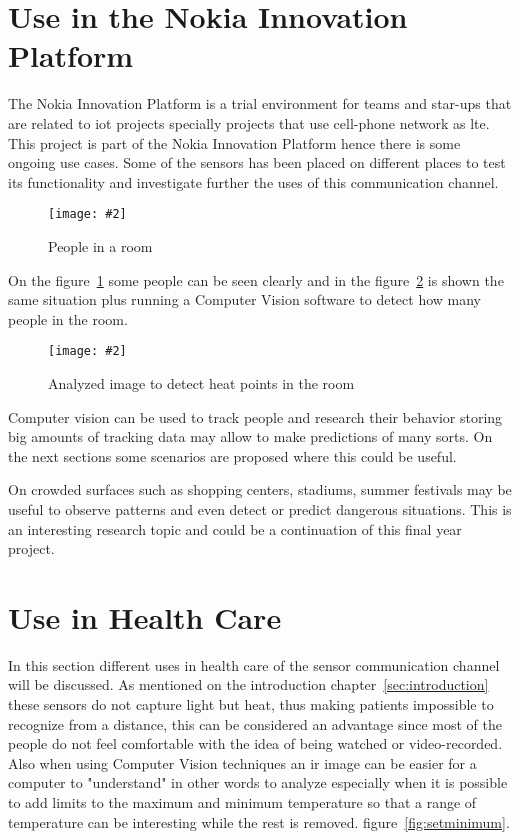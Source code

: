 \documentclass[hidelinks,11pt,a4paper,oneside,article]{memoir}
\newcommand{\putimage}[3][10] %
{
\begin{figure}[h]
	\centering
	\captionsetup{justification=centering}
	\texttt{[image: \#2]}
	\caption{#3}
	\label{fig:#2}
\end{figure}
}
\begin{document}
\section{Use in the Nokia Innovation Platform}\label{sec:use-in-the-nokia-innovation-platform}
The Nokia Innovation Platform is a trial environment for teams and star-ups that are related to \gls{iot} projects specially projects that use cell-phone network as \gls{lte}. This project is part of the Nokia Innovation Platform hence there is some ongoing use cases. Some of the sensors has been placed on different places to test its functionality and investigate further the uses of this communication channel.

	\putimage{people}{People in a room}
	
On the figure~\ref{fig:people} some people can be seen clearly and in the figure~\ref{fig:analysed} is shown the same situation plus running a Computer Vision software to detect how many people in the room.

	\putimage{analysed}{Analyzed image to detect heat points in the room}

Computer vision can be used to track people and research their behavior storing big amounts of tracking data may allow to make predictions of many sorts. On the next sections some scenarios are proposed where this could be useful.

On crowded surfaces such as shopping centers, stadiums, summer festivals may be useful to observe patterns and even detect or predict dangerous situations. This is an interesting research topic and could be a continuation of this final year project.


\section{Use in Health Care}
In this section different uses in health care of the sensor communication channel will be discussed. As mentioned on the introduction chapter~\ref{sec:introduction} these sensors do not capture light but heat, thus making patients impossible to recognize from a distance, this can be considered an advantage since most of the people do not feel comfortable with the idea of being watched or video-recorded. Also when using Computer Vision techniques an \gls{ir} image can be easier for a computer to "understand" in other words to analyze especially when it is possible to add limits to the maximum and minimum temperature so that a range of temperature can be interesting while the rest is removed. figure~\ref{fig:setminimum}.
    
\end{document}
